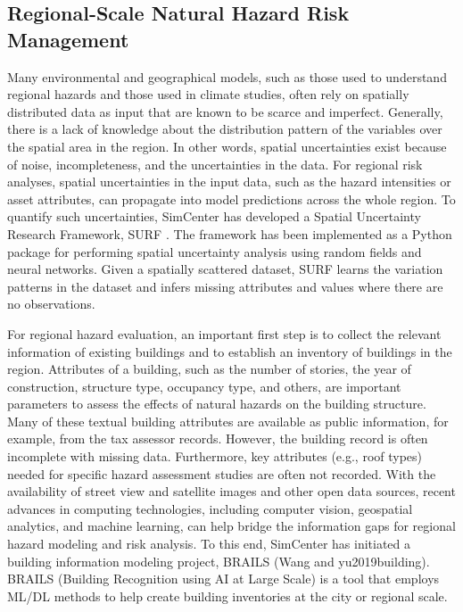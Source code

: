 \subsection{Regional-Scale Natural Hazard Risk Management }

Many environmental and geographical models, such as those used to understand regional hazards and those used in climate studies, often rely on spatially distributed data as input that are known to be scarce and imperfect. Generally, there is a lack of knowledge about the distribution pattern of the variables over the spatial area in the region. In other words, spatial uncertainties exist because of noise, incompleteness, and the uncertainties in the data. For regional risk analyses, spatial uncertainties in the input data, such as the hazard intensities or asset attributes, can propagate into model predictions across the whole region. To quantify such uncertainties, SimCenter has developed a Spatial Uncertainty Research Framework, SURF \citep{wang2019surf}. The framework has been implemented as a Python package for performing spatial uncertainty analysis using random fields and neural networks. Given a spatially scattered dataset, SURF learns the variation patterns in the dataset and infers missing attributes and values where there are no observations. 

For regional hazard evaluation, an important first step is to collect the relevant information of existing buildings and to establish an inventory of buildings in the region. Attributes of a building, such as the number of stories, the year of construction, structure type, occupancy type, and others, are important parameters to assess the effects of natural hazards on the building structure. Many of these textual building attributes are available as public information, for example, from the tax assessor records. However, the building record is often incomplete with missing data. Furthermore, key attributes (e.g., roof types) needed for specific hazard assessment studies are often not recorded. With the availability of street view and satellite images and other open data sources, recent advances in computing technologies, including computer vision, geospatial analytics, and machine learning, can help bridge the information gaps for regional hazard modeling and risk analysis. To this end, SimCenter has initiated a building information modeling project, BRAILS (Wang and yu2019building). BRAILS (Building Recognition using AI at Large Scale) is a tool that employs ML/DL methods to help create building inventories at the city or regional scale.

